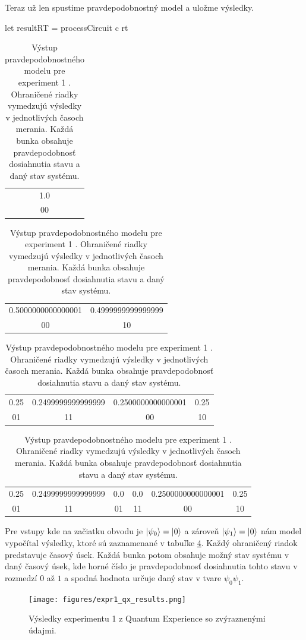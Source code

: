Teraz už len spustime pravdepodobnostný model a uložme výsledky.
\begin{code}
let resultRT = processCircuit c rt
\end{code}

\begin{table}
\centering
\begin{tabular}{|c|}
\hline
1.0 \\ 
00 \\ 
\hline
\end{tabular}

\begin{tabular}{|c|c|}
\hline
0.5000000000000001 & 0.4999999999999999 \\ 
00 & 10 \\ 
\hline
\end{tabular}

\begin{tabular}{|c|c|c|c|}
\hline
0.25 & 0.2499999999999999 & 0.2500000000000001 & 0.25 \\ 
01 & 11 & 00 & 10 \\ 
\hline
\end{tabular}

\begin{tabular}{|c|c|c|c|c|c|}
\hline
0.25 & 0.2499999999999999 & 0.0 & 0.0 & 0.2500000000000001 & 0.25 \\ 
01 & 11 & 01 & 11 & 00 & 10 \\ 
\hline
\end{tabular}
\caption{\label{expr1_vystup} Výstup pravdepodobnostného modelu pre experiment 1
. Ohraničené riadky vymedzujú výsledky v jednotlivých časoch merania. Každá
bunka obsahuje pravdepodobnosť dosiahnutia stavu a daný stav systému.}
\end{table}

Pre vstupy kde na začiatku obvodu je \(\ket{\psi_0} = \ket{0}\) a zároveň
\(\ket{\psi_1} = \ket{0}\) nám model vypočítal výsledky, ktoré sú zaznamenané
v tabuľke \ref{expr1_vystup}. Každý ohraničený riadok predstavuje časový úsek.
Každá bunka potom obsahuje možný stav systému v daný časový úsek, kde horné
číslo je pravdepodobnosť dosiahnutia tohto stavu v rozmedzí \(0\) až \(1\) a 
spodná hodnota určuje daný stav v tvare \(\psi_0\psi_1\).

\begin{figure} 
	\centering 
	\texttt{[image: figures/expr1\_qx\_results.png]} 
	\caption{Výsledky experimentu 1 z Quantum Experience so zvýraznenými 
údajmi.}

    \label{expr1_qx_results}
\end{figure}

